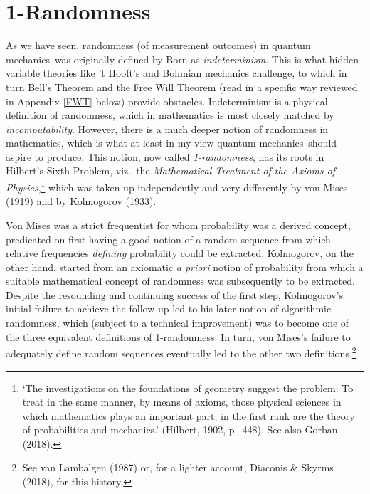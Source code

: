 \documentclass[11pt,a4paper]{article}
\numberwithin{equation}{section}
\newcommand{\qm}{quantum mechanics}
\begin{document}
 \section{1-Randomness}\label{AR}
 As we have seen, randomness (of measurement outcomes) in \qm\ was originally defined by Born as \emph{indeterminism}. This is  what hidden variable theories like 't Hooft's and Bohmian mechanics challenge, to which in turn Bell's Theorem and the Free Will Theorem (read in a specific way reviewed in Appendix \ref{FWT} below) provide obstacles. Indeterminism is a physical definition of randomness, which in mathematics is most closely matched by \emph{incomputability}. However, there is a much deeper notion of randomness in mathematics, which is what at least in my view \qm\  should aspire to produce. 
This notion, now called \emph{1-randomness}, has its roots in Hilbert's Sixth Problem, viz.\ the \emph{Mathematical Treatment of the Axioms of Physics},\footnote{`The investigations on the foundations of geometry suggest the problem: To treat in the same manner, by means of axioms, those physical sciences in which mathematics plays an important part; in the first rank are the theory of probabilities and mechanics.' (Hilbert, 1902, p.\ 448). See also Gorban (2018).} which was taken up independently and very differently  by von Mises (1919) and by Kolmogorov (1933). 

 Von Mises was a strict frequentist for whom probability was a derived concept, predicated on first having a good notion of a random sequence from which relative frequencies \emph{defining} probability could be extracted. Kolmogorov, on the other hand, started from an axiomatic \emph{a priori} notion of probability from which a suitable mathematical concept of randomness was subsequently to be extracted. Despite the resounding and continuing success of the first step, 
Kolmogorov's initial failure to achieve the follow-up  led to his later notion of algorithmic randomness, which (subject to a technical improvement) was to become one of the three equivalent definitions of 1-randomness. In turn, von Mises's failure to adequately define random sequences eventually led to the other two definitions.\footnote{See van Lambalgen (1987) or, for a lighter account, Diaconis \& Skyrms (2018), for this history. }  
\end{document}
